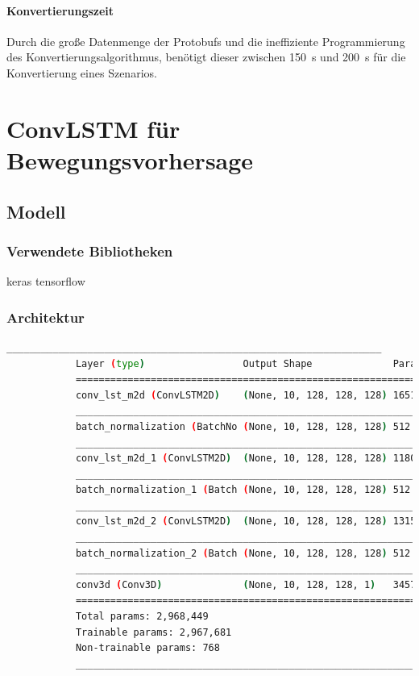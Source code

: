 \documentclass[12pt]{article}
\begin{document}
        \paragraph{Konvertierungszeit} Durch die große Datenmenge der Protobufs und die ineffiziente Programmierung des Konvertierungsalgorithmus, 
        benötigt dieser zwischen 150~s und 200~s für die Konvertierung eines Szenarios.

\pagebreak
\section{ConvLSTM für Bewegungsvorhersage}
    \subsection{Modell}
        \subsubsection{Verwendete Bibliotheken}
            keras
            tensorflow
        \subsubsection{Architektur}
            \begin{lstlisting}[language=bash, caption=Ausgabe des model.summary() Aufrufs, label={lst:summarylisting}]
            _________________________________________________________________
            Layer (type)                 Output Shape              Param #   
            =================================================================
            conv_lst_m2d (ConvLSTM2D)    (None, 10, 128, 128, 128) 1651712   
            _________________________________________________________________
            batch_normalization (BatchNo (None, 10, 128, 128, 128) 512       
            _________________________________________________________________
            conv_lst_m2d_1 (ConvLSTM2D)  (None, 10, 128, 128, 128) 1180160   
            _________________________________________________________________
            batch_normalization_1 (Batch (None, 10, 128, 128, 128) 512       
            _________________________________________________________________
            conv_lst_m2d_2 (ConvLSTM2D)  (None, 10, 128, 128, 128) 131584    
            _________________________________________________________________
            batch_normalization_2 (Batch (None, 10, 128, 128, 128) 512       
            _________________________________________________________________
            conv3d (Conv3D)              (None, 10, 128, 128, 1)   3457      
            =================================================================
            Total params: 2,968,449
            Trainable params: 2,967,681
            Non-trainable params: 768
            _________________________________________________________________
            \end{lstlisting}
\end{document}

